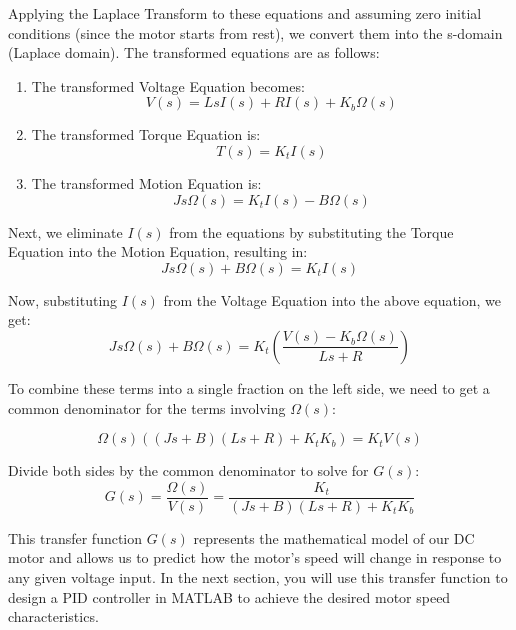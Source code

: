 \documentclass[11pt]{article}
\begin{document}
Applying the Laplace Transform to these equations and assuming zero initial conditions (since the motor starts from rest), we convert them into the s-domain (Laplace domain). The transformed equations are as follows:

\begin{enumerate}
    \item The transformed Voltage Equation becomes:
    \begin{equation}
    V(s) = LsI(s) + RI(s) + K_b \Omega(s)
    \end{equation}
    
    \item The transformed Torque Equation is:
    \begin{equation}
    T(s) = K_t I(s)
    \end{equation}
    
    \item The transformed Motion Equation is:
    \begin{equation}
    Js\Omega(s) = K_t I(s) - B\Omega(s)
    \end{equation}
\end{enumerate}

Next, we eliminate \( I(s) \) from the equations by substituting the Torque Equation into the Motion Equation, resulting in:
\begin{equation}
Js\Omega(s) + B\Omega(s) = K_t I(s)
\end{equation}

Now, substituting \( I(s) \) from the Voltage Equation into the above equation, we get:
\begin{equation}
Js\Omega(s) + B\Omega(s) = K_t \left( \frac{V(s) - K_b \Omega(s)}{Ls + R} \right)
\end{equation}

To combine these terms into a single fraction on the left side, we need to get a common denominator for the terms involving \( \Omega(s) \):

\begin{equation}
\Omega(s) ((Js + B)(Ls + R) + K_t K_b) = K_t V(s)
\end{equation}

Divide both sides by the common denominator to solve for \( G(s) \):
\begin{equation}
G(s) = \frac{\Omega(s)}{V(s)} = \frac{K_t}{(Js + B)(Ls + R) + K_t K_b}
\end{equation}

This transfer function \( G(s) \) represents the mathematical model of our DC motor and allows us to predict how the motor's speed will change in response to any given voltage input. In the next section, you will use this transfer function to design a PID controller in MATLAB to achieve the desired motor speed characteristics.
\end{document}

